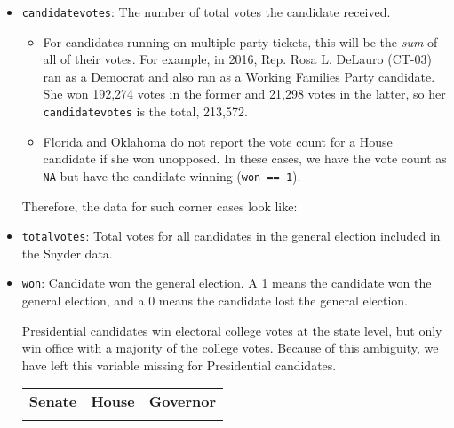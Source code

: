 \documentclass[12pt]{article}
\begin{document}
\begin{itemize}[leftmargin=*]
\begin{tabularx}{\linewidth}{C}
\textbf{Governor}\\

\end{tabularx}

\item \texttt{candidatevotes}: The number of total votes the candidate received. 
\begin{itemize}
\item For candidates running on multiple party tickets, this will be the \emph{sum} of all of their votes.  For example, in 2016, Rep. Rosa L. DeLauro (CT-03) ran as a Democrat and also ran as a Working Families Party candidate. She won 192,274 votes in the former and 21,298 votes in the latter, so her \texttt{candidatevotes} is the total, 213,572.
\item  Florida and Oklahoma do not report the vote count for a House candidate if she won unopposed. In these cases, we have the vote count as \texttt{NA} but have the candidate winning (\texttt{won == 1}).
\end{itemize}

Therefore, the data for such corner cases look like:

\begin{table}[!h]
\centering
\footnotesize

\end{table}


\item \texttt{totalvotes}: Total votes for all candidates in the general election included in the Snyder data.  

\item \texttt{won}: Candidate won the general election. A 1 means the candidate won the general election, and a 0 means the candidate lost the general election. 

Presidential candidates win electoral college votes at the state level, but only win office with a majority of the college votes. Because of this ambiguity, we have left this variable missing for Presidential candidates.

    \begin{tabularx}{\linewidth}{CCC}
    \textbf{Senate} & \textbf{House} & \textbf{Governor}\\
     &  & 
    \end{tabularx}


\end{itemize}
\end{document}
